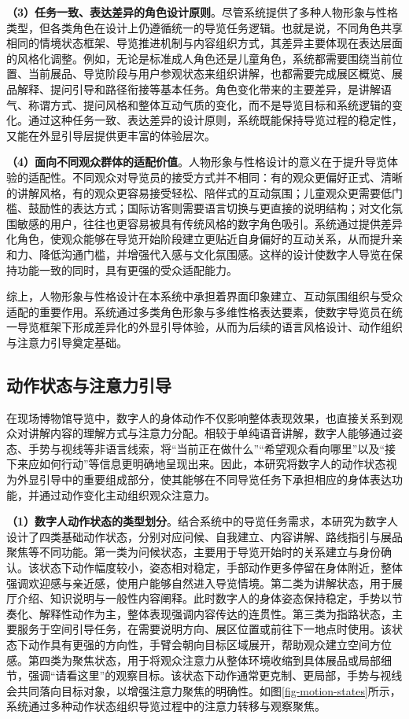 \textbf{（3）任务一致、表达差异的角色设计原则}。尽管系统提供了多种人物形象与性格类型，但各类角色在设计上仍遵循统一的导览任务逻辑。也就是说，不同角色共享相同的情境状态框架、导览推进机制与内容组织方式，其差异主要体现在表达层面的风格化调整。例如，无论是标准成人角色还是儿童角色，系统都需要围绕当前位置、当前展品、导览阶段与用户参观状态来组织讲解，也都需要完成展区概览、展品解释、提问引导和路径衔接等基本任务。角色变化带来的主要差异，是讲解语气、称谓方式、提问风格和整体互动气质的变化，而不是导览目标和系统逻辑的变化。通过这种任务一致、表达差异的设计原则，系统既能保持导览过程的稳定性，又能在外显引导层提供更丰富的体验层次。

\textbf{（4）面向不同观众群体的适配价值}。人物形象与性格设计的意义在于提升导览体验的适配性。不同观众对导览员的接受方式并不相同：有的观众更偏好正式、清晰的讲解风格，有的观众更容易接受轻松、陪伴式的互动氛围；儿童观众更需要低门槛、鼓励性的表达方式；国际访客则需要语言切换与更直接的说明结构；对文化氛围敏感的用户，往往也更容易被具有传统风格的数字角色吸引。系统通过提供差异化角色，使观众能够在导览开始阶段建立更贴近自身偏好的互动关系，从而提升亲和力、降低沟通门槛，并增强代入感与文化氛围感。这样的设计使数字人导览在保持功能一致的同时，具有更强的受众适配能力。

综上，人物形象与性格设计在本系统中承担着界面印象建立、互动氛围组织与受众适配的重要作用。系统通过多类角色形象与多维性格表达要素，使数字导览员在统一导览框架下形成差异化的外显引导体验，从而为后续的语言风格设计、动作组织与注意力引导奠定基础。

\subsection{动作状态与注意力引导}
在现场博物馆导览中，数字人的身体动作不仅影响整体表现效果，也直接关系到观众对讲解内容的理解方式与注意力分配。相较于单纯语音讲解，数字人能够通过姿态、手势与视线等非语言线索，将“当前正在做什么”“希望观众看向哪里”以及“接下来应如何行动”等信息更明确地呈现出来。因此，本研究将数字人的动作状态视为外显引导中的重要组成部分，使其能够在不同导览任务下承担相应的身体表达功能，并通过动作变化主动组织观众注意力。

\textbf{（1）数字人动作状态的类型划分}。结合系统中的导览任务需求，本研究为数字人设计了四类基础动作状态，分别对应问候、自我建立、内容讲解、路线指引与展品聚焦等不同功能。第一类为问候状态，主要用于导览开始时的关系建立与身份确认。该状态下动作幅度较小，姿态相对稳定，手部动作更多停留在身体附近，整体强调欢迎感与亲近感，使用户能够自然进入导览情境。第二类为讲解状态，用于展厅介绍、知识说明与一般性内容阐释。此时数字人的身体姿态保持稳定，手势以节奏化、解释性动作为主，整体表现强调内容传达的连贯性。第三类为指路状态，主要服务于空间引导任务，在需要说明方向、展区位置或前往下一地点时使用。该状态下动作具有更强的方向性，手臂会朝向目标区域展开，帮助观众建立空间方位感。第四类为聚焦状态，用于将观众注意力从整体环境收缩到具体展品或局部细节，强调“请看这里”的观察目标。该状态下动作通常更克制、更局部，手势与视线会共同落向目标对象，以增强注意力聚焦的明确性。如图\ref{fig-motion-states}所示，系统通过多种动作状态组织导览过程中的注意力转移与观察聚焦。

